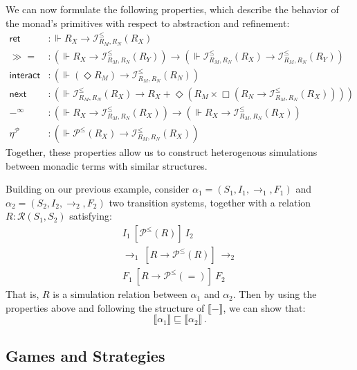 \documentclass[acmsmall,timestamp,review]{acmart}
\newcommand{\kw}[1]{\ensuremath{ \mathsf{#1} }}
\newcommand{\ifr}[1]{\ [{#1}]\ }
\newcommand{\bind}{\gg\!\!=}
\begin{document}
We can now formulate the following properties,
which describe the behavior of the monad's primitives
with respect to abstraction and refinement:
\begin{align*}
  \kw{ret} &:
    {}\Vdash R_X \rightarrow \mathcal{I}^\le_{R_M,R_N}(R_X) \\
  \bind &:
    (\Vdash R_X \rightarrow
     \mathcal{I}^\le_{R_M,R_N}(R_Y)) \rightarrow
    (\Vdash \mathcal{I}^\le_{R_M,R_N}(R_X) \rightarrow
     \mathcal{I}^\le_{R_M,R_N}(R_Y)) \\
  \kw{interact} &:
    (\Vdash (\Diamond R_M) \rightarrow
     \mathcal{I}^\le_{R_M,R_N}(R_N)) \\
  \kw{next} &:
    (\Vdash \mathcal{I}^\le_{R_M,R_N}(R_X) \rightarrow
     R_X +
     \Diamond (R_M \times
     \Box (R_N \rightarrow \mathcal{I}^\le_{R_M,R_N}(R_X)))) \\
  -^\infty &:
    (\Vdash R_X \rightarrow \mathcal{I}^\le_{R_M,R_N}(R_X)) \rightarrow
    (\Vdash R_X \rightarrow \mathcal{I}^\le_{R_M,R_N}(R_X)) \\
  \eta^\mathcal{P} &:
    (\Vdash \mathcal{P}^\le(R_X) \rightarrow
     \mathcal{I}^\le_{R_M,R_N}(R_X))
\end{align*}
Together,
these properties allow us to construct
heterogenous simulations
between monadic terms with similar structures.

\begin{example} \label{ex:sim}
Building on our previous example,
consider
$\alpha_1 = (S_1, I_1, {\rightarrow}_1, F_1)$ and
$\alpha_2 = (S_2, I_2, {\rightarrow}_2, F_2)$
two transition systems,
together with a relation
$R : \mathcal{R}(S_1, S_2)$
satisfying:
\begin{gather*}
  I_1 \ifr{\mathcal{P}^\le(R)} I_2 \\
  {\rightarrow}_1 \ifr{R \rightarrow \mathcal{P}^\le(R)} {\rightarrow}_2 \\
  F_1 \ifr{R \rightarrow \mathcal{P}^\le(=)} F_2
\end{gather*}
That is, $R$ is a simulation relation between $\alpha_1$ and $\alpha_2$.
Then by using the properties above and
following the structure of $\llbracket - \rrbracket$,
we can show that:
\[
    \llbracket \alpha_1 \rrbracket \sqsubseteq
    \llbracket \alpha_2 \rrbracket \,.
\]
\end{example}


\subsection{Games and Strategies} \label{sec:monad:games} %
\end{document}
